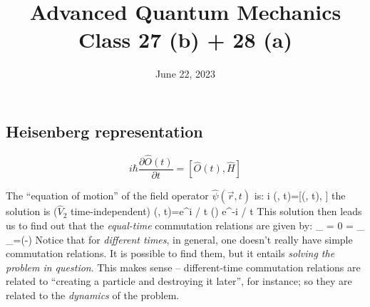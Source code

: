 \documentclass[12pt]{article}
\title{Advanced Quantum Mechanics\\Class 27 (b) + 28 (a)}
\date{June 22, 2023}                                           %
\begin{document}
\maketitle

\setcounter{section}{6}
\setcounter{subsection}{5}


\subsection{Heisenberg representation}
\[
\boxed{
i \hbar \frac{\partial \hat{O}(t)}{\partial t}=[\hat{O}(t), \hat{H}]
}
\]

The ``equation of motion'' of the field operator $\hat{\psi}(\vec{r}, t)$ is:
\setcounter{equation}{88}
\be
i \hbar {} \hat{\psi}(, t)=[\hat{\psi}(, t), ]
\ee
the solution is ($\hat{V}_2$ time-independent)
\be
\hat{\psi}(, t)=e^{i / \hbar {} t} \hat{\psi}() e^{-i / \hbar {} t}
\ee
%
This solution then leads us to find out that the \emph{equal-time} commutation relations are given by:
\be
{}_{\mp} = 0 =
_{\mp}
\ee
\be
{}_{\mp}=\delta\left(-\vecrp\right)
\ee
Notice that for \emph{different times}, in general, 
one doesn't really have simple commutation relations.
It is possible to find them, but it entails
\emph{solving the problem in question}.
This makes sense -- different-time commutation relations are related to
``creating a particle and destroying it later'', for instance;
so they are related to the \emph{dynamics} of the problem.
\end{document}
